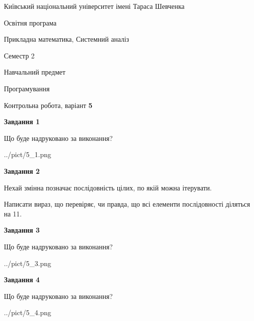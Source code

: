 \documentclass[12pt, ukrainian]{article}
\begin{document}
{{\begin {small}\par
{ \center  Київський національний університет імені Тараса Шевченка \par}
{\parbox {5 cm}{Освітня програма \hfill}{\parbox {8 cm}{Прикладна математика, Системний аналіз \hfill}}\parbox {5 cm}{\hfill Семестр 2}}\par
{\parbox {5 cm} {Навчальний предмет \hfill}\parbox {7 cm}{Програмування \hfill}\parbox {6cm}{\hfill}\par}\vspace{-7pt} \end{small}}{\center Контрольна робота, варіант  \No \textbf
{ 5 }\par}}
{
\begin {large}
{\begin {center}\textbf{Завдання 1}\end {center}}\par
Що буде надруковано за виконання?\par\par
\begin{center}
	{../pict/5_1.png}
\end{center}
\newpage

{\begin {center}\textbf{Завдання 2}\end {center}}\par
Нехай змінна  позначає послідовність цілих, по якій можна ітерувати.

Написати вираз, що перевіряє, чи правда, що всі елементи послідовності діляться на 11.\par
\newpage

{\begin {center}\textbf{Завдання 3}\end {center}}\par
Що буде надруковано за виконання?\par
\begin{center}
	{../pict/5_3.png}
\end{center}
\newpage

{\begin {center}\textbf{Завдання 4}\end {center}}\par
Що буде надруковано за виконання?\par
\begin{center}
	{../pict/5_4.png}
\end{center}
\newpage


\end{large}}
\end{document}

